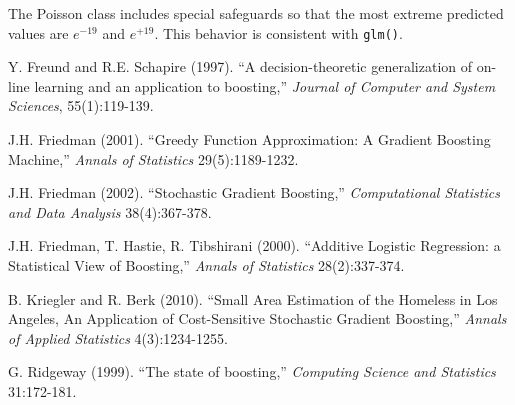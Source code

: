 \documentclass{article}
\begin{document}
The Poisson class includes special safeguards so that the most extreme predicted values are $e^{-19}$ and $e^{+19}$. This behavior is consistent with \texttt{glm()}.

\begin{thebibliography}{77}     %

\small                          %

 Y. Freund and R.E. Schapire (1997). ``A decision-theoretic generalization of on-line learning and an application to boosting,'' \textit{Journal of Computer and System Sciences}, 55(1):119-139.

 J.H. Friedman (2001). ``Greedy Function Approximation: A Gradient Boosting Machine,'' \textit{Annals of Statistics} 29(5):1189-1232.

 J.H. Friedman (2002). ``Stochastic Gradient Boosting,'' \textit{Computational Statistics and Data Analysis} 38(4):367-378.

 J.H. Friedman, T. Hastie, R. Tibshirani (2000). ``Additive Logistic Regression: a Statistical View of Boosting,'' \textit{Annals of Statistics} 28(2):337-374.
    
 B. Kriegler and R. Berk (2010). ``Small Area Estimation of the Homeless in Los Angeles, An Application of Cost-Sensitive Stochastic Gradient Boosting,'' \textit{Annals of Applied Statistics} 4(3):1234-1255.

 G. Ridgeway (1999). ``The state of boosting,'' \textit{Computing Science and Statistics} 31:172-181.

\end{thebibliography}           %
\end{document}
